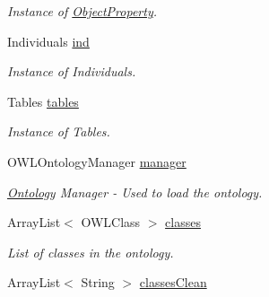 \begin{DoxyCompactItemize}
\begin{DoxyCompactList}\small\item\em Instance of \hyperlink{class_ontology_1_1_object_property}{ObjectProperty}. \end{DoxyCompactList}\item 
\hypertarget{class_ontology_1_1_ontology_af8d92920b83a12fa85e86c9b8b606c2e}{
Individuals \hyperlink{class_ontology_1_1_ontology_af8d92920b83a12fa85e86c9b8b606c2e}{ind}}
\label{class_ontology_1_1_ontology_af8d92920b83a12fa85e86c9b8b606c2e}

\begin{DoxyCompactList}\small\item\em Instance of Individuals. \end{DoxyCompactList}\item 
\hypertarget{class_ontology_1_1_ontology_abf6ad8e362e7c57b8fad20f688765dac}{
Tables \hyperlink{class_ontology_1_1_ontology_abf6ad8e362e7c57b8fad20f688765dac}{tables}}
\label{class_ontology_1_1_ontology_abf6ad8e362e7c57b8fad20f688765dac}

\begin{DoxyCompactList}\small\item\em Instance of Tables. \end{DoxyCompactList}\item 
\hypertarget{class_ontology_1_1_ontology_a23f7c60be021e9813bc3b004166b12d1}{
OWLOntologyManager \hyperlink{class_ontology_1_1_ontology_a23f7c60be021e9813bc3b004166b12d1}{manager}}
\label{class_ontology_1_1_ontology_a23f7c60be021e9813bc3b004166b12d1}

\begin{DoxyCompactList}\small\item\em \hyperlink{class_ontology_1_1_ontology}{Ontology} Manager -\/ Used to load the ontology. \end{DoxyCompactList}\item 
\hypertarget{class_ontology_1_1_ontology_a60484a66d42244f83c944d7fd7f67fcf}{
ArrayList$<$ OWLClass $>$ \hyperlink{class_ontology_1_1_ontology_a60484a66d42244f83c944d7fd7f67fcf}{classes}}
\label{class_ontology_1_1_ontology_a60484a66d42244f83c944d7fd7f67fcf}

\begin{DoxyCompactList}\small\item\em List of classes in the ontology. \end{DoxyCompactList}\item 
\hypertarget{class_ontology_1_1_ontology_a35b7af950c4bd1f698fcf18cb38f4e02}{
ArrayList$<$ String $>$ \hyperlink{class_ontology_1_1_ontology_a35b7af950c4bd1f698fcf18cb38f4e02}{classesClean}}
\label{class_ontology_1_1_ontology_a35b7af950c4bd1f698fcf18cb38f4e02}


\end{DoxyCompactItemize}
